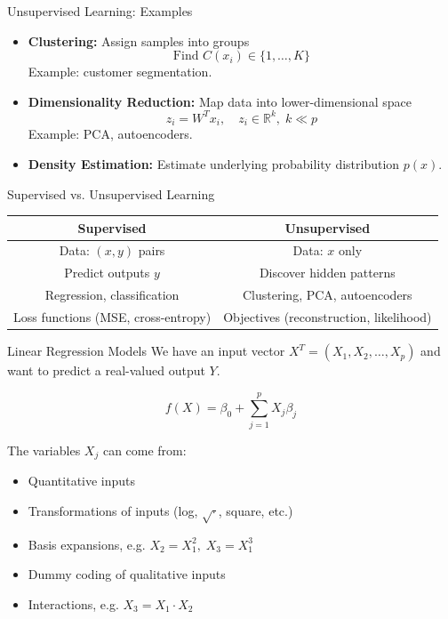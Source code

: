 \documentclass[../../main.tex]{subfiles}
\begin{document}
\begin{frame}{Unsupervised Learning: Examples}
\begin{itemize}
    \item \textbf{Clustering:} Assign samples into groups
    \[
    \text{Find } C(x_i) \in \{1, \ldots, K\}
    \]
    Example: customer segmentation.
    \item \textbf{Dimensionality Reduction:} Map data into lower-dimensional space
    \[
    z_i = W^T x_i, \quad z_i \in \mathbb{R}^k, \; k \ll p
    \]
    Example: PCA, autoencoders.
    \item \textbf{Density Estimation:} Estimate underlying probability distribution $p(x)$.
\end{itemize}
\end{frame}

\begin{frame}{Supervised vs. Unsupervised Learning}
\begin{center}
\begin{tabular}{|c|c|}
\hline
\textbf{Supervised} & \textbf{Unsupervised} \\
\hline
Data: $(x,y)$ pairs & Data: $x$ only \\
Predict outputs $y$ & Discover hidden patterns \\
Regression, classification & Clustering, PCA, autoencoders \\
Loss functions (MSE, cross-entropy) & Objectives (reconstruction, likelihood) \\
\hline
\end{tabular}
\end{center}
\end{frame}


\begin{frame}{Linear Regression Models}
We have an input vector $X^T = (X_1, X_2, \ldots, X_p)$ and want to predict a real-valued output $Y$.

\[
f(X) = \beta_0 + \sum_{j=1}^p X_j \beta_j
\]

The variables $X_j$ can come from:
\begin{itemize}
    \item Quantitative inputs
    \item Transformations of inputs (log, $\sqrt{\cdot}$, square, etc.)
    \item Basis expansions, e.g. $X_2 = X_1^2, \; X_3 = X_1^3$
    \item Dummy coding of qualitative inputs
    \item Interactions, e.g. $X_3 = X_1 \cdot X_2$
\end{itemize}
\end{frame}
\end{document}
